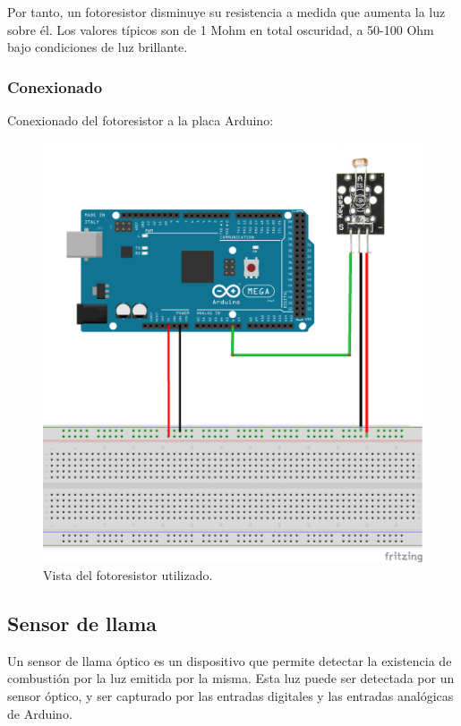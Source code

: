Por tanto, un fotoresistor disminuye su resistencia a medida que aumenta la luz sobre él. Los valores típicos son de 1 Mohm en total oscuridad, a 50-100 Ohm bajo condiciones de 
luz brillante.\\

\subsubsection{Conexionado}

Conexionado del fotoresistor a la placa Arduino:

\begin{figure}[H]
  \begin{center}
    \includegraphics[scale=0.5]{imagenes/fotoresistor_conexionado.png}
  \end{center}
  \caption{Vista del fotoresistor utilizado.}
  \label{figura:conexionado_fotoresistor}
\end{figure}


\subsection{Sensor de llama}

Un sensor de llama óptico es un dispositivo que permite detectar la existencia de combustión por la luz emitida por la misma. Esta luz puede ser detectada por un sensor óptico, 
y ser capturado por las entradas digitales y las entradas analógicas de Arduino.\\

